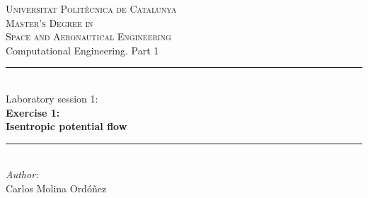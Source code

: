 
\begin{titlepage}

\newcommand{\HRule}{\rule{\linewidth}{0.5mm}} %

\center %


\textsc{\LARGE Universitat Politècnica de Catalunya}\\[0.5cm]
\textsc{\Large Master's Degree in\\ Space and Aeronautical Engineering}\\[1.8cm]

\Large Computational Engineering. Part 1\\





\HRule \\[0.2cm]
\Large Laboratory session 1:\\[0.5cm]
{ \Large \bfseries
Exercise 1:\\
Isentropic potential flow\\}
\HRule \\[3.5cm]


\emph{Author:}\\
{\normalsize
Carlos Molina Ordóñez\\
}



\end{titlepage}
